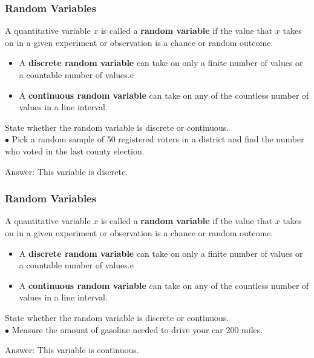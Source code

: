 \documentclass[Lecture.tex]{subfiles}
\begin{document}
\begin{frame}
\frametitle{Random Variables}
\begin{definition}
A quantitative variable $x$ is called a \textbf{random variable} if the value that $x$ takes on in a given experiment or observation is a chance or random outcome.
\begin{itemize}
\item A \textbf{discrete random variable} can take on only a finite number of values or a countable number of values.e
\item A \textbf{continuous random variable} can take on any of the countless number of values in a line interval.
\end{itemize}
\end{definition}
\begin{example}
State whether the random variable is discrete or continuous.\\ \pause
 {$\bullet$} Pick a random sample of 50 registered voters in a district and find the number who voted in the last county election.\pause
\begin{flushright}Answer: This variable is discrete.\end{flushright}
\end{example}
\end{frame}

\begin{frame}
\frametitle{Random Variables}
\begin{definition}
A quantitative variable $x$ is called a \textbf{random variable} if the value that $x$ takes on in a given experiment or observation is a chance or random outcome.
\begin{itemize}
\item A \textbf{discrete random variable} can take on only a finite number of values or a countable number of values.e
\item A \textbf{continuous random variable} can take on any of the countless number of values in a line interval.
\end{itemize}
\end{definition}
\begin{example}
State whether the random variable is discrete or continuous.\\ \pause
 {$\bullet$} Measure the amount of gasoline needed to drive your car 200 miles.\pause
\begin{flushright}Answer: This variable is continuous.\end{flushright}
\end{example}
\end{frame}
\end{document}
